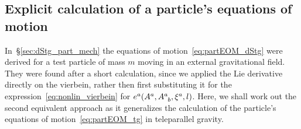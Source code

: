 \documentclass[
final,
11pt,
a4paper,
DIV=11,
headinclude=true,
footinclude=false,
bibliography=totoc,
twoside=true,  %
BCOR=5mm
]{scrbook}
\begin{document}
\newpage
\begin{subappendices}

\section{Explicit calculation of a particle's equations of 
  motion}
\label{app:expl_calc_eoms_part}

In~\S\ref{sec:dStg_part_mech} the equations of 
motion~\eqref{eq:partEOM_dStg} were derived for a test particle 
of mass $m$ moving in an external gravitational field. They 
were found after a short calculation, since we applied the Lie 
derivative directly on the vierbein, rather then first 
substituting it for the expression~\eqref{eq:nonlin_vierbein} for 
$e^a(A^a, A\ind{^a_b}, \xi^a, l)$. Here, we shall work out the 
second equivalent approach as it generalizes the calculation of 
the particle's equations of motion~\eqref{eq:partEOM_tg} in 
teleparallel gravity.


\end{subappendices}
\end{document}
